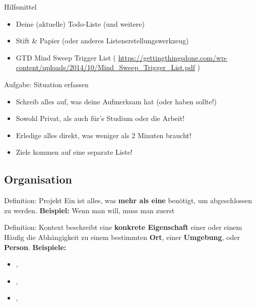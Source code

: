 \begin{frame}[c]{Hilfsmittel}
    \large
    \begin{itemize}[<+(1)->]
        \item Deine (aktuelle) Todo-Liste (und weitere)
        \item Stift \& Papier (oder anderes Listenerstellungswerkzeug)
        \item GTD Mind Sweep Trigger List \cite{trigger-list} ( \url{https://gettingthingsdone.com/wp-content/uploads/2014/10/Mind_Sweep_Trigger_List.pdf} )
    \end{itemize}
\end{frame}

\begin{frame}[c]
    \large
    \begin{block}{Aufgabe: Situation erfassen}
    \begin{itemize}[<+(1)->]
        \item Schreib alles auf, was deine Aufmerksam hat (oder haben sollte!)
        \item Sowohl Privat, als auch für's Studium oder die Arbeit!
        \item Erledige alles direkt, was weniger als 2 Minuten braucht!
        \item Ziele kommen auf eine separate Liste!
    \end{itemize}
    \end{block}
\end{frame}
\fpause


\subsection{Organisation}

\begin{frame}[c]{Definition: Projekt}
    Ein  ist alles, was \textbf{mehr als eine}  benötigt, um abgeschlossen zu werden. \newline \newline \pause
    \textbf{Beispiel:} Wenn man 
    will, muss man zuerst 
\end{frame}


\begin{frame}[c]{Definition: Kontext}
     beschreibt eine \textbf{konkrete Eigenschaft} einer
     oder einem  Häufig die Abhängigkeit zu einem
    bestimmten \textbf{Ort}, einer \textbf{Umgebung}, oder \textbf{Person}.
    \newline \newline \pause
    \textbf{Beispiele:}
    \begin{itemize}[<+(1)->]
        \item {}, 
        \item {}, 
        \item {}, 
    \end{itemize}
\end{frame}


